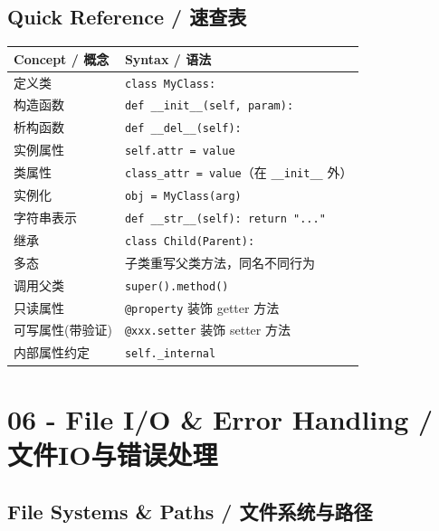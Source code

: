 \documentclass[11pt,a4paper]{report}
\let\oldtexttt\texttt
\renewcommand{\texttt}[1]{\textcolor{mainblue}{\oldtexttt{#1}}}
\begin{document}
\section{Quick Reference / 速查表}

\medskip
\centering
\small
\renewcommand{\arraystretch}{1.3}
\begin{tabular}{@{}ll@{}}
\toprule
\textbf{Concept / 概念} & \textbf{Syntax / 语法} \\ \midrule
定义类 & \texttt{class MyClass:} \\
构造函数 & \texttt{def \_\_init\_\_(self, param):} \\
析构函数 & \texttt{def \_\_del\_\_(self):} \\
实例属性 & \texttt{self.attr = value} \\
类属性 & \texttt{class\_attr = value}（在 \texttt{\_\_init\_\_} 外） \\
实例化 & \texttt{obj = MyClass(arg)} \\
字符串表示 & \texttt{def \_\_str\_\_(self): return "..."} \\
继承 & \texttt{class Child(Parent):} \\
多态 & 子类重写父类方法，同名不同行为 \\
调用父类 & \texttt{super().method()} \\
只读属性 & \texttt{@property} 装饰 getter 方法 \\
可写属性(带验证) & \texttt{@xxx.setter} 装饰 setter 方法 \\
内部属性约定 & \texttt{self.\_internal} \\ \bottomrule
\end{tabular}
\medskip



\chapter{06 - File I/O \& Error Handling / 文件IO与错误处理}



\section{File Systems \& Paths / 文件系统与路径}
\end{document}
